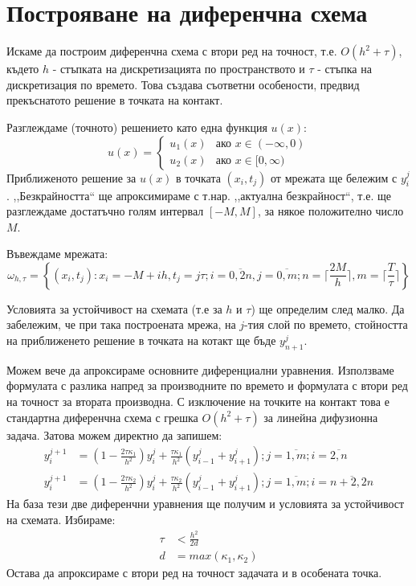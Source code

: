 \section{Построяване на диференчна схема}
Искаме да построим диференчна схема с втори ред на точност, т.е. $O(h^2 + \tau)$, където $h$ - стъпката на дискретизацията по пространството и $\tau$  - стъпка на дискретизация по времето.
Това създава съответни особености, предвид прекъснатото решение в точката на контакт.

\noindent Разглеждаме (точното) решението като една функция $u(x)$:
\begin{equation}
    u(x)=
        \begin{cases}
            u_1(x) & \text{ако } x \in (-\infty, 0)\\
            u_2(x) & \text{ако } x \in [0, \infty)
        \end{cases}
\end{equation}
Приближеното решение за $u(x)$ в точката $(x_i, t_j)$ от мрежата ще бележим с $y_{i}^{j}$. ,,Безкрайността`` ще апроксимираме с т.нар. ,,актуална безкрайност``, т.е. ще разглеждаме достатъчно голям интервал $[-M, M]$, за някое положително число $M$.

\noindent Въвеждаме мрежата:
\begin{equation*}
    \omega_{h, \tau } = \left\{ (x_i, t_j):  x_i = -M + i h, t_j = j \tau; i = \overline{0,2n}, j = \overline{0,m};  n = \lceil \frac{2M}{h} \rceil, m =\lceil \frac{T}{\tau} \rceil \right\}
\end{equation*}

\noindent Условията за устойчивост на схемата (т.е за $h$ и $\tau$) ще определим след малко.
Да забележим, че при така построената мрежа, на $j$-тия слой по времето, стойността на приближенето решение в точката на котакт ще бъде $y_{n+1}^j$.

Можем вече да апроксираме основните диференциални уравнения. Използваме формулата с разлика напред за производните по времето и формулата с втори ред на точност за втората производна.
С изключение на точките на контакт това е стандартна диференчна схема с грешка $O(h^2+\tau)$ за линейна дифузионна задача. Затова можем директно да запишем:
\begin{align}
    y_{i}^{j+1} &= \left(1-\frac{2 \tau \kappa_1}{h^2}\right)y_{i}^j + \frac{\tau \kappa_1}{h^2}\left(y_{i-1}^j + y_{i+1}^j\right); j = \overline{1, m}; i  = \overline{2, n} \\
    y_{i}^{j+1} &= \left(1-\frac{2 \tau \kappa_2}{h^2}\right)y_{i}^j + \frac{\tau \kappa_2}{h^2}\left(y_{i-1}^j + y_{i+1}^j\right); j = \overline{1, m}; i  = \overline{n+2, 2n}
\end{align}
На база тези две диференчни уравнения ще получим и условията за устойчивост на схемата. Избираме:
\begin{align*}
    \tau &< \frac{h^2}{2 d}\\
    d &= max \left(\kappa_1, \kappa_2\right)
\end{align*}
Остава да апроксираме с втори ред на точност задачата и в особената точка.